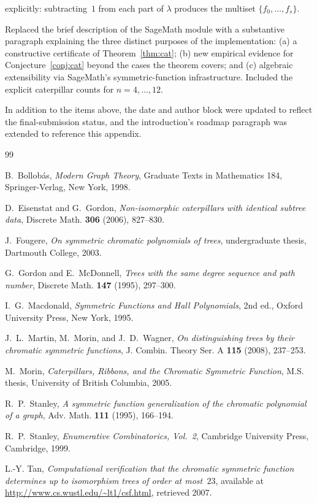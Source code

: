 \documentclass[11pt]{article}
\theoremstyle{definition}
\begin{document}
\begin{description}[leftmargin=*,style=nextline,font=\normalfont\bfseries]
      explicitly: subtracting~$1$ from each part of $\lambda$ produces
      the multiset $\{f_0,\ldots,f_s\}$.
\item[Item 7: Section~\ref{sec:code} insight beyond verification.]
      Replaced the brief description of the SageMath module with a
      substantive paragraph explaining the three distinct purposes of
      the implementation: (a) a constructive certificate of
      Theorem~\ref{thm:cat}; (b) new empirical evidence for
      Conjecture~\ref{conj:cat} beyond the cases the theorem covers;
      and (c) algebraic extensibility via SageMath's symmetric-function
      infrastructure.  Included the explicit caterpillar counts for
      $n=4,\ldots,12$.
\end{description}

In addition to the items above, the date and author block were updated
to reflect the final-submission status, and the introduction's roadmap
paragraph was extended to reference this appendix.

\begin{thebibliography}{99}

 B.~Bollob\'as,
  \emph{Modern Graph Theory},
  Graduate Texts in Mathematics 184, Springer-Verlag, New York, 1998.

 D.~Eisenstat and G.~Gordon,
  \emph{Non-isomorphic caterpillars with identical subtree data},
  Discrete Math. \textbf{306} (2006), 827--830.

 J.~Fougere,
  \emph{On symmetric chromatic polynomials of trees},
  undergraduate thesis, Dartmouth College, 2003.

 G.~Gordon and E.~McDonnell,
  \emph{Trees with the same degree sequence and path number},
  Discrete Math. \textbf{147} (1995), 297--300.

 I.~G.~Macdonald,
  \emph{Symmetric Functions and Hall Polynomials}, 2nd ed.,
  Oxford University Press, New York, 1995.

 J.~L.~Martin, M.~Morin, and J.~D.~Wagner,
  \emph{On distinguishing trees by their chromatic symmetric functions},
  J. Combin. Theory Ser. A \textbf{115} (2008), 237--253.

 M.~Morin,
  \emph{Caterpillars, Ribbons, and the Chromatic Symmetric Function},
  M.S. thesis, University of British Columbia, 2005.

 R.~P.~Stanley,
  \emph{A symmetric function generalization of the chromatic polynomial
  of a graph},
  Adv. Math. \textbf{111} (1995), 166--194.

 R.~P.~Stanley,
  \emph{Enumerative Combinatorics, Vol.~2},
  Cambridge University Press, Cambridge, 1999.

 L.-Y. Tan,
  \emph{Computational verification that the chromatic symmetric
  function determines up to isomorphism trees of order at most~$23$},
  available at \url{http://www.cs.wustl.edu/~lt1/csf.html}, retrieved
  2007.

\end{thebibliography}
\end{document}
